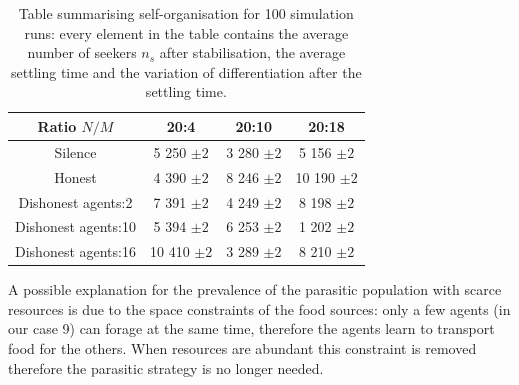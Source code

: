 \begin{table}[htbp]
\caption[Tabular results for self organisation property]{
Table summarising self-organisation for 100 simulation runs:
every element in the table contains the average number of seekers $n_{s}$ after stabilisation,
the average settling time and the variation of differentiation after the settling time.
\label{tab:population}}
\begin{center}
\small{
\begin{tabular}{@{}c|ccc@{}}
\hline
Ratio $N/M$ & 20:4 & 20:10 & 20:18\\
\hline
Silence & 5 250 $\pm 2$ & 3 280 $\pm 2$ & 5 156 $\pm 2$\\
\hline
Honest & 4 390 $\pm 2$ & 8 246 $\pm 2 $ & 10 190 $\pm 2 $\\
\hline
Dishonest agents:2  & 7 391 $\pm 2$ & 4 249 $\pm 2$ & 8 198 $\pm 2$\\
Dishonest agents:10 & 5 394 $\pm 2$ & 6 253 $\pm 2$ & 1 202 $\pm 2$\\
Dishonest agents:16 & 10 410 $\pm 2$ & 3 289 $\pm 2$ & 8 210 $\pm 2$\\
\end{tabular}
}
\end{center}
\end{table}


A possible explanation for the prevalence of the parasitic population with scarce resources is due to the space constraints of the food sources: only a few agents (in our case 9) can forage at the same time, therefore the agents learn to transport food for the others. When resources are abundant this constraint is removed therefore the parasitic strategy is no longer needed.

